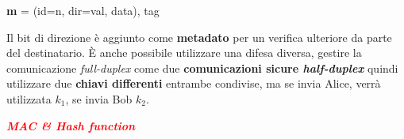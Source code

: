\begin{flushleft}
    {\centering
        \textbf{m} = (id=n, dir=val, data), tag
    \par}

    Il bit di direzione è aggiunto come \textbf{metadato} per un verifica ulteriore da parte del destinatario. È anche possibile utilizzare una difesa diversa, gestire la comunicazione \textit{full-duplex} come due \textbf{comunicazioni sicure \textit{half-duplex}} quindi utilizzare due \textbf{chiavi differenti} entrambe condivise, ma se invia Alice, verrà utilizzata $k_1$, se invia Bob $k_2$.

    \medskip

    \textcolor{red}{\textbf{\textit{MAC \& Hash function}}}
\end{flushleft}